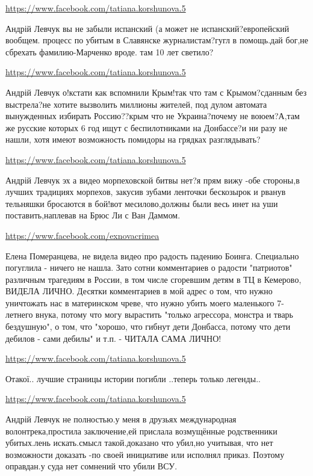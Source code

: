 \documentclass[a4paper,11pt]{extreport}
\begin{document}
\begin{itemize}
\begin{itemize}
\url{https://www.facebook.com/tatiana.korshunova.5}

Андрій Левчук вы не забыли испанский (а может не испанский?европейский вообщем. процесс по убитым в Славянске журналистам?гугл в помощь.дай бог,не сбрехать фамилию-Марченко вроде. там 10 лет светило?

\url{https://www.facebook.com/tatiana.korshunova.5}

Андрій Левчук о!кстати как вспомнили Крым!так что там с Крымом?сданным без выстрела?не хотите вызволить миллионы жителей, под дулом автомата вынужденных избирать Россию??крым что не Украина?почему не воюем?А,там же русские которых 6 год ищут с беспилотниками на Донбассе?и ни разу не нашли, хотя имеют возможность помидоры на грядках разглядывать?

\url{https://www.facebook.com/tatiana.korshunova.5}

Андрій Левчук эх а видео морпеховской битвы нет?я прям вижу -обе стороны,в лучших традициях морпехов, закусив зубами ленточки бескозырок и рванув тельняшки бросаются в бой!вот месилово,должны были весь инет на уши поставить,наплевав на Брюс Ли с Ван Даммом.

\url{https://www.facebook.com/exnovacrimea}

Елена Померанцева, не видела видео про радость падению Боинга. Специально погуглила - ничего не нашла. Зато сотни комментариев о радости "патриотов" различным трагедиям в России, в том числе сгоревшим детям в ТЦ в Кемерово, ВИДЕЛА ЛИЧНО. Десятки комментариев в мой адрес о том, что нужно уничтожать нас в материнском чреве, что нужно убить моего маленького 7-летнего внука, потому что могу вырастить "только агрессора, монстра и тварь бездушную", о том, что "хорошо, что гибнут дети Донбасса, потому что дети дебилов - сами дебилы" и т.п. - ЧИТАЛА САМА ЛИЧНО!

\url{https://www.facebook.com/tatiana.korshunova.5}

Отакої.. лучшие страницы истории погибли ..теперь только легенды..

\url{https://www.facebook.com/tatiana.korshunova.5}

Андрій Левчук не полностью.у меня в друзьях международная волонтрека,простила заключение,ей прислала возмущённые родственники убитых.лень искать.смысл такой.доказано что убил,но учитывая, что нет возможности доказать -по своей инициативе или исполнял приказ. Поэтому оправдан.у суда нет сомнений что убили ВСУ.


\end{itemize}
\end{itemize}
\end{document}

